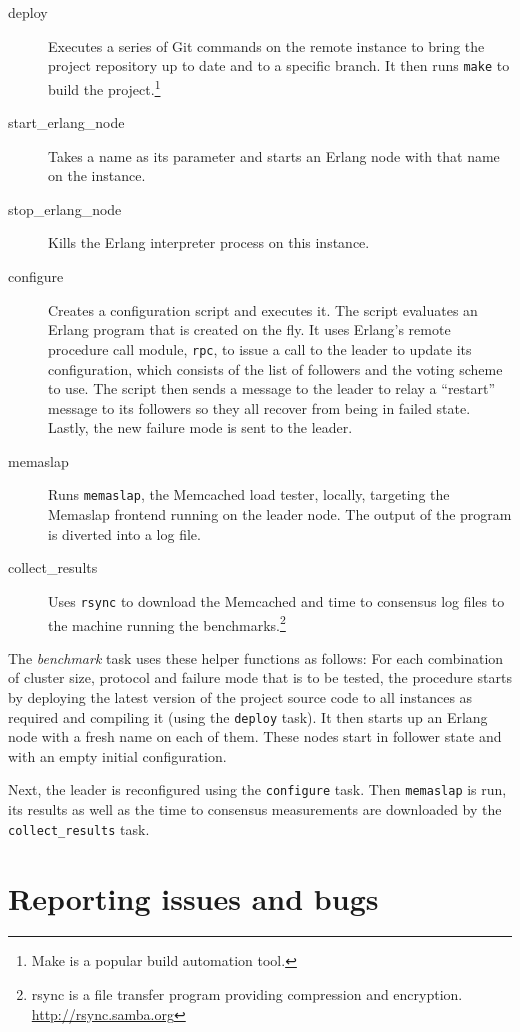 \documentclass[11pt,chapterprefix=true,toc=bibliography,numbers=noendperiod,
               footnotes=multiple,twoside]{scrreprt}
\begin{document}
\begin{description}
    \item[deploy] Executes a series of Git commands on the remote instance to bring the project repository up to date and to a specific branch. It then runs \texttt{make} to build the project.\footnote{Make is a popular build automation tool.}
    \item[start\_erlang\_node] Takes a name as its parameter and starts an Erlang node with that name on the instance.
    \item[stop\_erlang\_node] Kills the Erlang interpreter process on this instance.
    \item[configure] Creates a configuration script and executes it. The script evaluates an Erlang program that is created on the fly. It uses Erlang's remote procedure call module, \texttt{rpc}, to issue a call to the leader to update its configuration, which consists of the list of followers and the voting scheme to use. The script then sends a message to the leader to relay a \enquote{restart} message to its followers so they all recover from being in failed state. Lastly, the new failure mode is sent to the leader.
    \item[memaslap] Runs \texttt{memaslap}, the Memcached load tester, locally, targeting the Memaslap frontend running on the leader node. The output of the program is diverted into a log file.
    \item[collect\_results] Uses \texttt{rsync} to download the Memcached and time to consensus log files to the machine running the benchmarks.\footnote{rsync is a file transfer program providing compression and encryption. \url{http://rsync.samba.org}}
\end{description}

The \textit{benchmark} task uses these helper functions as follows: For each combination of cluster size, protocol and failure mode that is to be tested, the procedure starts by deploying the latest version of the project source code to all instances as required and compiling it (using the \texttt{deploy} task). It then starts up an Erlang node with a fresh name on each of them. These nodes start in follower state and with an empty initial configuration.

Next, the leader is reconfigured using the \texttt{configure} task. Then \texttt{memaslap} is run, its results as well as the time to consensus measurements are downloaded by the \texttt{collect\_results} task.

\section{Reporting issues and bugs}
\end{document}
